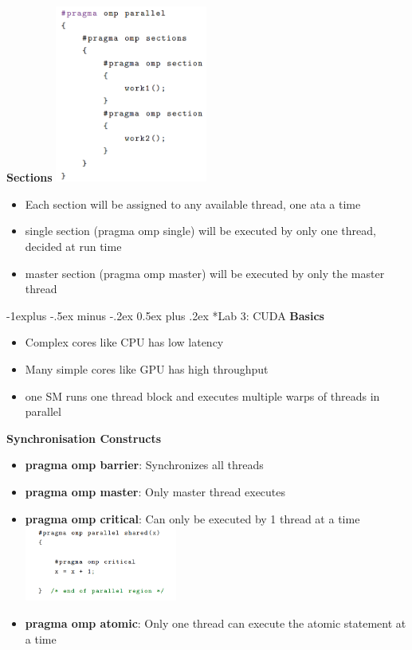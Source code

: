 \documentclass[10pt, landscape]{article}
\makeatletter
\renewcommand{\subsection}{\@startsection{subsection}{2}{0mm}%
                                {-1explus -.5ex minus -.2ex}%
                                {0.5ex plus .2ex}%
                                {\normalfont\normalsize\bfseries}}
\makeatother
\begin{document}
\begin{multicols}{4}
\textbf{Sections}
\includegraphics*[width=5cm]{section.png}
\begin{itemize}
    \item Each section will be assigned to any available thread, one ata a time
    \item single section (pragma omp single) will be executed by only one thread, decided at run time 
    \item master section (pragma omp master) will be executed by only the master thread
\end{itemize}

\subsection*{Lab 3: CUDA}
\textbf{Basics}
\begin{itemize}
    \item Complex cores like CPU has low latency 
    \item Many simple cores like GPU has high throughput
    \item one SM runs one thread block and executes multiple warps of threads in parallel
\end{itemize}

\textbf{Synchronisation Constructs}
\begin{itemize}
    \item \textbf{pragma omp barrier}: Synchronizes all threads 
    \item \textbf{pragma omp master}: Only master thread executes
    \item \textbf{pragma omp critical}: Can only be executed by 1 thread at a time 
    \includegraphics*[width=5cm]{critical.png}
    \item \textbf{pragma omp atomic}: Only one thread can execute the atomic statement at a time
\end{itemize}


\end{multicols}
\end{document}
